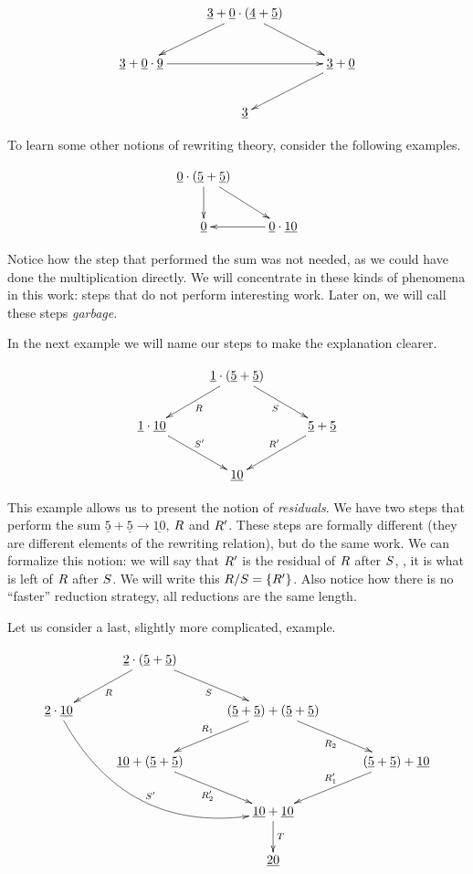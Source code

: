 \[
\xymatrix@C=1cm{
  & \underline{3} + \underline{0} \cdot (\underline{4} + \underline{5}) \ar[dr] \ar[dl]& \\
  \underline{3} + \underline{0} \cdot \underline{9} \ar[rr] & & \underline{3} + \underline{0} \ar[dl] \\
  & \underline{3} &
}
\]

To learn some other notions of rewriting theory, consider the following examples.

\[
\xymatrix{
  \underline{0} \cdot (\underline{5} + \underline{5}) \ar[d] \ar[dr] &                                           \\
  \underline{0}                                                      & \ar[l] \underline{0} \cdot \underline{10}
}
\]

Notice how the step that performed the sum was not needed, as we could have done the multiplication
directly. We will concentrate in these kinds of phenomena in this work: steps that do not perform interesting
work. Later on, we will call these steps \emph{garbage}.

In the next example we will name our steps to make the explanation clearer.

\[
\xymatrix@C=1cm{
  & \underline{1} \cdot (\underline{5} + \underline{5}) \ar[dl]^{\redex} \ar[dr]_{\redextwo}& \\
\underline{1} \cdot \underline{10} \ar[dr]^{\redextwo'} & & \underline{5} + \underline{5} \ar[dl]_{\redex'} \\
  & \underline{10} &
}
\]

This example allows us to present the notion of \emph{residuals}. We have two
steps that perform the sum $\underline{5} + \underline{5} \to \underline{10}$, $R$ and $R'$.
These steps are formally different (they are different elements of the rewriting relation),
but do the same work. We can formalize this notion:
we will say that $R'$ is the residual of $R$ after $S$, \ie, it is what is left of $R$
after $S$. We will write this $R / S = \{R'\}$.
Also notice how there is no ``faster'' reduction  strategy, all reductions are the same length.

Let us consider a last, slightly more complicated, example.

\[
\xymatrix@C=1cm{
  & \underline{2} \cdot (\underline{5} + \underline{5}) \ar[dl]^{\redex} \ar[dr]_{\redextwo} & & \\
\underline{2} \cdot \underline{10} \ar@/_3pc/[ddrr]^{\redextwo'} & & (\underline{5} + \underline{5}) + (\underline{5} + \underline{5}) \ar[dl]_{\redex_1} \ar[dr]_{\redex_2}& \\
  & \underline{10} + (\underline{5} + \underline{5}) \ar[dr]_{\redex_2'} & & (\underline{5} + \underline{5}) + \underline{10} \ar[dl]_{\redex_1'} \\
  & & \underline{10} + \underline{10} \ar[d]^{\redexthree}& \\
  & & \underline{20} &
}
\]

